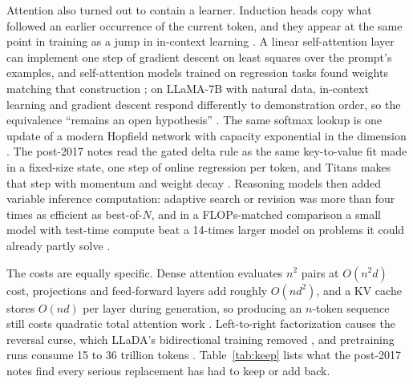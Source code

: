 Attention also turned out to contain a learner. Induction heads copy what followed an earlier occurrence of the current token, and they appear at the same point in training as a jump in in-context learning \cite{post90}. A linear self-attention layer can implement one step of gradient descent on least squares over the prompt's examples, and self-attention models trained on regression tasks found weights matching that construction \cite{post91}; on LLaMA-7B with natural data, in-context learning and gradient descent respond differently to demonstration order, so the equivalence ``remains an open hypothesis'' \cite{post92}. The same softmax lookup is one update of a modern Hopfield network with capacity exponential in the dimension \cite{post21}. The post-2017 notes read the gated delta rule \cite{post8} as the same key-to-value fit made in a fixed-size state, one step of online regression per token, and Titans makes that step with momentum and weight decay \cite{post24}. Reasoning models then added variable inference computation: adaptive search or revision was more than four times as efficient as best-of-$N$, and in a FLOPs-matched comparison a small model with test-time compute beat a 14-times larger model on problems it could already partly solve \cite{post93}.

The costs are equally specific. Dense attention evaluates $n^2$ pairs at $O(n^2 d)$ cost, projections and feed-forward layers add roughly $O(nd^2)$, and a KV cache stores $O(nd)$ per layer during generation, so producing an $n$-token sequence still costs quadratic total attention work \cite{pre52}. Left-to-right factorization causes the reversal curse, which LLaDA's bidirectional training removed \cite{post101}, and pretraining runs consume 15 to 36 trillion tokens \cite{post84,post85}. Table~\ref{tab:keep} lists what the post-2017 notes find every serious replacement has had to keep or add back.

